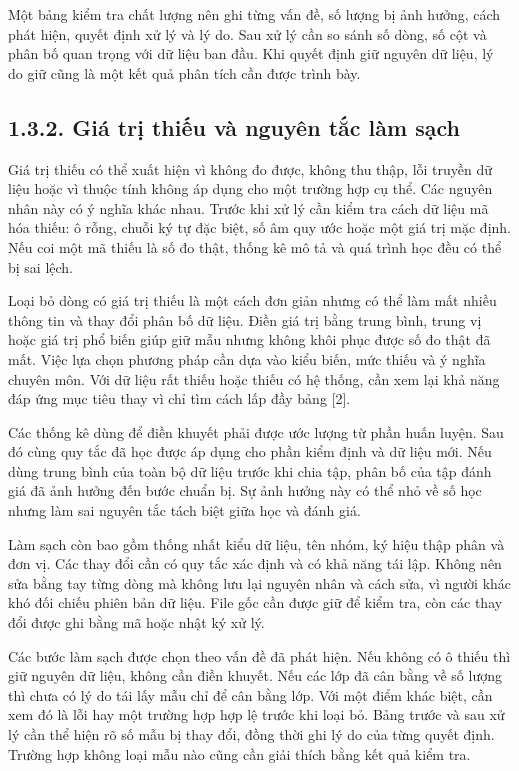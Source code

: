 Một bảng kiểm tra chất lượng nên ghi từng vấn đề, số lượng bị ảnh hưởng, cách phát hiện, quyết định xử lý và lý do. Sau xử lý cần so sánh số dòng, số cột và phân bố quan trọng với dữ liệu ban đầu. Khi quyết định giữ nguyên dữ liệu, lý do giữ cũng là một kết quả phân tích cần được trình bày.


\subsection{1.3.2. Giá trị thiếu và nguyên tắc làm sạch}

Giá trị thiếu có thể xuất hiện vì không đo được, không thu thập, lỗi truyền dữ liệu hoặc vì thuộc tính không áp dụng cho một trường hợp cụ thể. Các nguyên nhân này có ý nghĩa khác nhau. Trước khi xử lý cần kiểm tra cách dữ liệu mã hóa thiếu: ô rỗng, chuỗi ký tự đặc biệt, số âm quy ước hoặc một giá trị mặc định. Nếu coi một mã thiếu là số đo thật, thống kê mô tả và quá trình học đều có thể bị sai lệch.


Loại bỏ dòng có giá trị thiếu là một cách đơn giản nhưng có thể làm mất nhiều thông tin và thay đổi phân bố dữ liệu. Điền giá trị bằng trung bình, trung vị hoặc giá trị phổ biến giúp giữ mẫu nhưng không khôi phục được số đo thật đã mất. Việc lựa chọn phương pháp cần dựa vào kiểu biến, mức thiếu và ý nghĩa chuyên môn. Với dữ liệu rất thiếu hoặc thiếu có hệ thống, cần xem lại khả năng đáp ứng mục tiêu thay vì chỉ tìm cách lấp đầy bảng [2].


Các thống kê dùng để điền khuyết phải được ước lượng từ phần huấn luyện. Sau đó cùng quy tắc đã học được áp dụng cho phần kiểm định và dữ liệu mới. Nếu dùng trung bình của toàn bộ dữ liệu trước khi chia tập, phân bố của tập đánh giá đã ảnh hưởng đến bước chuẩn bị. Sự ảnh hưởng này có thể nhỏ về số học nhưng làm sai nguyên tắc tách biệt giữa học và đánh giá.


Làm sạch còn bao gồm thống nhất kiểu dữ liệu, tên nhóm, ký hiệu thập phân và đơn vị. Các thay đổi cần có quy tắc xác định và có khả năng tái lập. Không nên sửa bằng tay từng dòng mà không lưu lại nguyên nhân và cách sửa, vì người khác khó đối chiếu phiên bản dữ liệu. File gốc cần được giữ để kiểm tra, còn các thay đổi được ghi bằng mã hoặc nhật ký xử lý.


Các bước làm sạch được chọn theo vấn đề đã phát hiện. Nếu không có ô thiếu thì giữ nguyên dữ liệu, không cần điền khuyết. Nếu các lớp đã cân bằng về số lượng thì chưa có lý do tái lấy mẫu chỉ để cân bằng lớp. Với một điểm khác biệt, cần xem đó là lỗi hay một trường hợp hợp lệ trước khi loại bỏ. Bảng trước và sau xử lý cần thể hiện rõ số mẫu bị thay đổi, đồng thời ghi lý do của từng quyết định. Trường hợp không loại mẫu nào cũng cần giải thích bằng kết quả kiểm tra.


